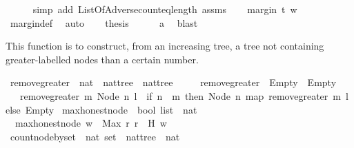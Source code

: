 \begin{isabellebody}
\ \ \ \ \isamarkupfalse%
\ {\isacharparenleft}simp\ add{\isacharcolon}\ ListOfAdverse{\isacharunderscore}count{\isacharunderscore}eq{\isacharunderscore}length\ assms{\isacharparenright}\isanewline
\ \ \isamarkupfalse%
\ {\isachardoublequoteopen}margin\ t\ w\ {\isasymge}\ {}{\isachardoublequoteclose}\isanewline
\ \ \ \ \isamarkupfalse%
\ margin{\isacharunderscore}def\ \isamarkupfalse%
\ auto\isanewline
\ \ \isamarkupfalse%
\ {\isacharquery}thesis\isanewline
\ \ \ \ \isamarkupfalse%
\ a\ \isamarkupfalse%
\ blast\ \isanewline
\ \isamarkupfalse%
%
\endisatagproof
{\isafoldproof}%
%
\isadelimproof
%
\endisadelimproof
%
\begin{isamarkuptext}%
This function is to construct, from an increasing tree, a tree not containing greater-labelled 
nodes than a certain number.%
\end{isamarkuptext}\isamarkuptrue%
\isamarkupfalse%
\ remove{\isacharunderscore}greater\ {\isacharcolon}{\isacharcolon}\ {\isachardoublequoteopen}nat\ {\isasymRightarrow}\ nattree\ {\isasymRightarrow}\ nattree{\isachardoublequoteclose}\ \isanewline
\ \ \ \ {\isachardoublequoteopen}remove{\isacharunderscore}greater\ {\isacharunderscore}\ Empty\ {\isacharequal}\ Empty{\isachardoublequoteclose}\ \isanewline
\ \ {\isacharbar}\ {\isachardoublequoteopen}remove{\isacharunderscore}greater\ m\ {\isacharparenleft}Node\ n\ l{\isacharparenright}\ {\isacharequal}\ {\isacharparenleft}if\ n\ {\isacharless}\ m\ then\ Node\ n\ {\isacharparenleft}map\ {\isacharparenleft}remove{\isacharunderscore}greater\ m{\isacharparenright}\ l{\isacharparenright}\ else\ Empty{\isacharparenright}{\isachardoublequoteclose}\isanewline
\isanewline
{}\isamarkupfalse%
\ max{\isacharunderscore}honest{\isacharunderscore}node\ {\isacharcolon}{\isacharcolon}\ {\isachardoublequoteopen}bool\ list\ {\isasymRightarrow}\ nat{\isachardoublequoteclose}\ \isanewline
\ \ {\isachardoublequoteopen}max{\isacharunderscore}honest{\isacharunderscore}node\ w\ {\isacharequal}\ Max\ {\isacharbraceleft}r{\isachardot}\ r\ {\isasymin}\ H\ w{\isacharbraceright}{\isachardoublequoteclose}\isanewline
\ \ \ \isanewline
{}\isamarkupfalse%
\ count{\isacharunderscore}node{\isacharunderscore}by{\isacharunderscore}set\ {\isacharcolon}{\isacharcolon}\ {\isachardoublequoteopen}nat\ set\ {\isasymRightarrow}\ nattree\ {\isasymRightarrow}\ nat{\isachardoublequoteclose}\ \isanewline

\end{isabellebody}
